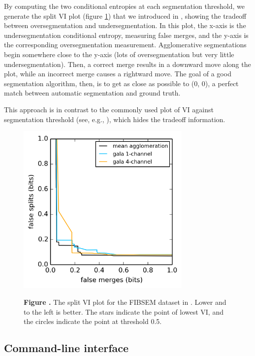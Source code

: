 \documentclass{frontiersSCNS} %
\begin{document}
By computing the two conditional entropies at each segmentation threshold, we generate the split VI plot (figure \ref{fig:02}) that we introduced in \cite{NunezIglesias:2013cd}, showing the tradeoff between oversegmentation and undersegmentation.
In this plot, the x-axis is the undersegmentation conditional entropy, measuring false merges, and the y-axis is the corresponding oversegmentation measurement.
Agglomerative segmentations begin somewhere close to the y-axis (lots of oversegmentation but very little undersegmentation).
Then, a correct merge results in a downward move along the plot, while an incorrect merge causes a rightward move.
The goal of a good segmentation algorithm, then, is to get as close as possible to (0, 0), a perfect match between automatic segmentation and ground truth.

This approach is in contrast to the commonly used plot of VI against segmentation threshold (see, e.g., \cite{Andres:2012vp}), which hides the tradeoff information.

\begin{figure}
\begin{center}
\includegraphics[width=85mm]{figure2}
\end{center}
 \textbf{\label{fig:02} Figure .}{ The split VI plot for the FIBSEM dataset in \cite{NunezIglesias:2013cd}. Lower and to the left is better. The stars indicate the point of lowest VI, and the circles indicate the point at threshold 0.5. }
\end{figure}

\subsection{Command-line interface}
\end{document}
